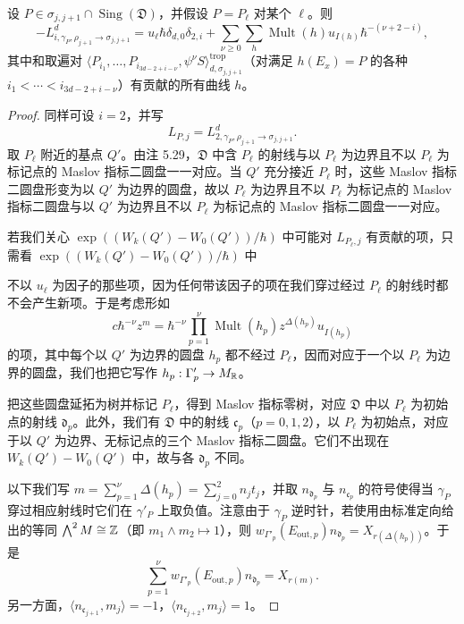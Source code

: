 \begin{lemma}
设 $P\in\sigma_{j,j+1}\cap\operatorname{Sing}(\mathfrak D)$，并假设 $P=P_\ell$ 对某个 $\ell$。则
\[
  -L^d_{i,\gamma_P,\rho_{j+1}\to\sigma_{j,j+1}}
  =u_\ell\hbar\delta_{d,0}\delta_{2,i}
  +\sum_{\nu\ge0}\sum_{h}\operatorname{Mult}(h)u_{I(h)}\hbar^{-(\nu+2-i)},
\]
其中和取遍对 $\langle P_{i_1},\ldots,P_{i_{3d-2+i-\nu}},\psi^\nu S\rangle^{\mathrm{trop}}_{d,\sigma_{j,j+1}}$（对满足 $h(E_x)=P$ 的各种 $i_1<\cdots<i_{3d-2+i-\nu}$）有贡献的所有曲线 $h$。
\end{lemma}

\begin{proof}
同样可设 $i=2$，并写
\[
  L_{P,j}=L^d_{2,\gamma_P,\rho_{j+1}\to\sigma_{j,j+1}}.
\]
取 $P_\ell$ 附近的基点 $Q'$。由注 5.29，$\mathfrak D$ 中含 $P_\ell$ 的射线与以 $P_\ell$ 为边界且不以 $P_\ell$ 为标记点的 Maslov 指标二圆盘一一对应。当 $Q'$ 充分接近 $P_\ell$ 时，这些 Maslov 指标二圆盘形变为以 $Q'$ 为边界的圆盘，故以 $P_\ell$ 为边界且不以 $P_\ell$ 为标记点的 Maslov 指标二圆盘与以 $Q'$ 为边界且不以 $P_\ell$ 为标记点的 Maslov 指标二圆盘一一对应。

若我们关心 $\exp((W_k(Q')-W_0(Q'))/\hbar)$ 中可能对 $L_{P_\ell,j}$ 有贡献的项，只需看 $\exp((W_k(Q')-W_0(Q'))/\hbar)$ 中

不以 $u_\ell$ 为因子的那些项，因为任何带该因子的项在我们穿过经过 $P_\ell$ 的射线时都不会产生新项。于是考虑形如
\begin{equation}
  c\hbar^{-\nu}z^m=\hbar^{-\nu}\prod_{p=1}^{\nu}\operatorname{Mult}(h_p)z^{\Delta(h_p)}u_{I(h_p)} \tag{5.42}
\end{equation}
的项，其中每个以 $Q'$ 为边界的圆盘 $h_p$ 都不经过 $P_\ell$，因而对应于一个以 $P_\ell$ 为边界的圆盘，我们也把它写作 $h_p:\Gamma'_p\to M_{\mathbb{R}}$。

把这些圆盘延拓为树并标记 $P_\ell$，得到 Maslov 指标零树，对应 $\mathfrak D$ 中以 $P_\ell$ 为初始点的射线 $\mathfrak d_p$。此外，我们有 $\mathfrak D$ 中的射线 $\mathfrak c_p$（$p=0,1,2$），以 $P_\ell$ 为初始点，对应于以 $Q'$ 为边界、无标记点的三个 Maslov 指标二圆盘。它们不出现在 $W_k(Q')-W_0(Q')$ 中，故与各 $\mathfrak d_p$ 不同。

以下我们写 $m=\sum_{p=1}^{\nu}\Delta(h_p)=\sum_{j=0}^{2}n_jt_j$，并取 $n_{\mathfrak d_p}$ 与 $n_{\mathfrak c_p}$ 的符号使得当 $\gamma_P$ 穿过相应射线时它们在 $\gamma'_P$ 上取负值。注意由于 $\gamma_P$ 逆时针，若使用由标准定向给出的等同 $\bigwedge^2M\cong\mathbb{Z}$（即 $m_1\wedge m_2\mapsto1$），则 $w_{\Gamma'_p}(E_{\mathrm{out},p})n_{\mathfrak d_p}=X_{r(\Delta(h_p))}$。于是
\begin{equation}
  \sum_{p=1}^{\nu}w_{\Gamma'_p}(E_{\mathrm{out},p})n_{\mathfrak d_p}=X_{r(m)}. \tag{5.43}
\end{equation}
另一方面，$\langle n_{\mathfrak c_{j+1}},m_j\rangle=-1$，$\langle n_{\mathfrak c_{j+2}},m_j\rangle=1$。


\end{proof}
